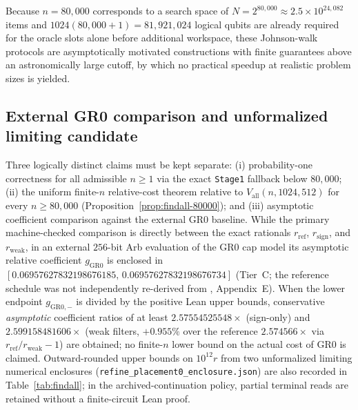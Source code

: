 \documentclass[11pt,a4paper]{article}
\theoremstyle{definition}
\theoremstyle{remark}
\begin{document}
Because \(n = 80{,}000\) corresponds to a search space of \(N = 2^{80{,}000} \approx 2.5 \times 10^{24{,}082}\) items and \(1024(80{,}000 + 1) = 81{,}921{,}024\) logical qubits are already required for the oracle slots alone before additional workspace, these Johnson-walk protocols are asymptotically motivated constructions with finite guarantees above an astronomically large cutoff, by which no practical speedup at realistic problem sizes is yielded.

\subsection{External \textrm{GR0} comparison and unformalized limiting candidate}

Three logically distinct claims must be kept separate: (i) probability-one correctness for all admissible \(n \ge 1\) via the exact \texttt{Stage1} fallback below \(80{,}000\); (ii) the uniform finite-\(n\) relative-cost theorem relative to \(V_{\mathrm{all}}(n,1024,512)\) for every \(n \ge 80{,}000\) (Proposition~\ref{prop:findall-80000}); and (iii) asymptotic coefficient comparison against the external \textrm{GR0} baseline. While the primary machine-checked comparison is directly between the exact rationals \(r_{\mathrm{ref}}\), \(r_{\mathrm{sign}}\), and \(r_{\mathrm{weak}}\), in an external \(256\)-bit Arb evaluation of the \textrm{GR0} cap model its asymptotic relative coefficient \(g_{\mathrm{GR0}}\) is enclosed in \([0.06957627832198676185,\, 0.06957627832198676734]\) (Tier~C; the reference schedule was not independently re-derived from \cite{shirobokov2026}, Appendix~E). When the lower endpoint \(g_{\mathrm{GR0},-}\) is divided by the positive Lean upper bounds, conservative \emph{asymptotic} coefficient ratios of at least \(2.57554525548\times\) (sign-only) and \(2.599158481606\times\) (weak filters, \(+0.955\%\) over the reference \(2.574566\times\) via \(r_{\mathrm{ref}}/r_{\mathrm{weak}}-1\)) are obtained; no finite-\(n\) lower bound on the actual cost of \textrm{GR0} is claimed. Outward-rounded upper bounds on \(10^{12}r\) from two unformalized limiting numerical enclosures (\texttt{refine\_placement0\_enclosure.json}) are also recorded in Table~\ref{tab:findall}; in the archived-continuation policy, partial terminal reads are retained without a finite-circuit Lean proof.
\end{document}
